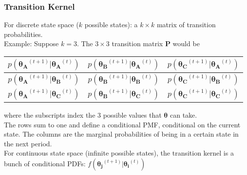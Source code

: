\documentclass{beamer}
\begin{document}
\begin{frame}
\frametitle{Transition Kernel}
\pause
For discrete state space ($k$ possible states): \pause a $k \times k$ matrix of transition probabilities.\\
\bigskip
\pause
Example: Suppose $k = 3$.  \pause The $3 \times 3$ transition matrix
$\bm{P}$ would be
\begin{table}[!htp]
\begin{center}
\begin{tabular}{|c|c|c|}
\hline
$p(\bm{\theta_A}^{(t+1)} | \bm{\theta_A}^{(t)} )$ & $p(\bm{\theta_B}^{(t+1)} |
\bm{\theta_A}^{(t)} )$ & $p(\bm{\theta_C}^{(t+1)} |
\bm{\theta_A}^{(t)} )$ \\
\hline
$p(\bm{\theta_A}^{(t+1)} | \bm{\theta_B}^{(t)} )$ & $p(\bm{\theta_B}^{(t+1)} |
\bm{\theta_B}^{(t)} )$ & $p(\bm{\theta_C}^{(t+1)} |
\bm{\theta_B}^{(t)} )$ \\
\hline
$p(\bm{\theta_A}^{(t+1)} | \bm{\theta_C}^{(t)} )$ & $p(\bm{\theta_B}^{(t+1)} |
\bm{\theta_C}^{(t)} )$ & $p(\bm{\theta_C}^{(t+1)} |
\bm{\theta_C}^{(t)} )$ \\
\hline
\end{tabular}
\end{center}
\end{table}
where the subscripts index the 3 possible values that $\bm{\theta}$
can take.  \\
\bigskip
\pause
The rows sum to one and define a conditional PMF, conditional on the
current state.  \pause The columns
are the marginal probabilities of being in a certain state in the next
period.\\
\pause
\bigskip
For continuous state space (infinite possible states), the transition
kernel is a bunch of conditional PDFs: $f(\bm{\theta_j}^{(t+1)} | \bm{\theta_i}^{(t)})$
\end{frame}
\end{document}
